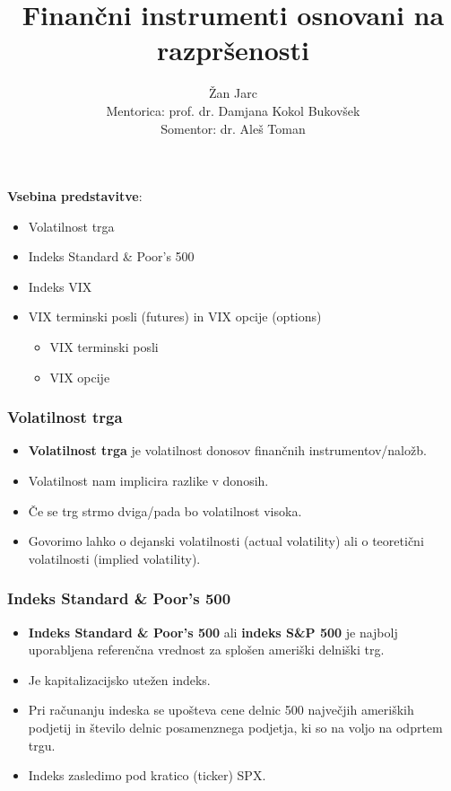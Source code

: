 \documentclass[10pt]{beamer}
\begin{document}
\title[Finančni instrumenti osnovani na razpršenosti]{Finančni instrumenti osnovani na razpršenosti}
\author{Žan Jarc\\Mentorica: prof. dr. Damjana Kokol Bukovšek\\ Somentor: dr. Aleš Toman}

\begin{frame}
	\titlepage
\end {frame}

\begin{frame}
\textbf{Vsebina predstavitve}:
	\begin{itemize}
		\item Volatilnost trga
		\item Indeks Standard \& Poor’s 500 
		\item Indeks VIX
		\item VIX terminski posli (futures) in VIX opcije (options)
			\begin{itemize}
				\item VIX terminski posli
				\item VIX opcije
			\end{itemize}
	\end{itemize}
\end {frame}

\begin{frame}
\frametitle{Volatilnost trga}
\begin{itemize}
\item \textbf{Volatilnost trga} je volatilnost donosov finančnih instrumentov/naložb.

\item Volatilnost nam implicira razlike v donosih.

\item Če se trg strmo dviga/pada bo volatilnost visoka.
\item Govorimo lahko o dejanski volatilnosti (actual volatility) ali o teoretični volatilnosti (implied volatility).
\end{itemize}
\end{frame}

\begin{frame}
\frametitle{Indeks Standard \& Poor’s 500}
\begin{itemize}
\item \textbf{Indeks Standard \& Poor’s 500} ali \textbf{indeks S\&P 500} je najbolj uporabljena referenčna vrednost za splošen ameriški delniški trg.
\item Je kapitalizacijsko utežen indeks. 
\item Pri računanju indeska se upošteva cene delnic 500 največjih ameriških podjetij in število delnic posamenznega podjetja, ki so na voljo na odprtem trgu.
\item Indeks zasledimo pod kratico (ticker) SPX.

\end{itemize}
\end{frame}
\end{document}
